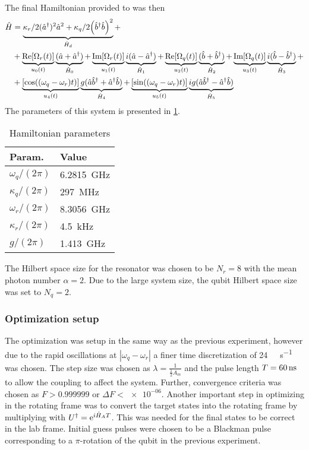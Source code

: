 \documentclass[main.tex]{subfiles}
\begin{document}
The final Hamiltonian provided to \krotov{} was then
\begin{equation}
    \begin{split}
        \hat{H} &= \underbrace{\kappa_r/2(\hat{a}^\dagger)^2\hat{a}^2 +\kappa_q/2\qty(\hat{b}^\dagger\hat{b})^2}_{\hat{H}_d} + \\
        &+\underbrace{\text{Re}\qty[\Omega_r(t)]}_{u_0(t)}\underbrace{(\hat{a} + \hat{a}^\dagger)}_{\hat{H}_0} + \underbrace{\text{Im}\qty[\Omega_r(t)]}_{u_1(t)}\underbrace{i(\hat{a} - \hat{a}^\dagger)}_{\hat{H}_1} + \underbrace{\text{Re}\qty[\Omega_q(t)]}_{u_2(t)}\underbrace{(\hat{b} + \hat{b}^\dagger)}_{\hat{H}_2} + \underbrace{\text{Im}\qty[\Omega_q(t)]}_{u_3(t)}\underbrace{i(\hat{b} - \hat{b}^\dagger)}_{\hat{H}_3} +\\
        &+\underbrace{\qty[\cos((\omega_q-\omega_r)t)]}_{u_4(t)}\underbrace{g(\hat{a}\hat{b}^\dagger + \hat{a}^\dagger\hat{b})}_{\hat{H}_4} + \underbrace{\qty[\sin((\omega_q-\omega_r)t)]}_{u_5(t)}\underbrace{ig(\hat{a}\hat{b}^\dagger - \hat{a}^\dagger\hat{b})}_{\hat{H}_5}
        \label{eq:cat-hamiltonian-rotating}
    \end{split}
\end{equation}
The parameters of this system is presented in \cref{tab:ham-params}.
\begin{table}[H]
    \caption{Hamiltonian parameters}%
    \label{tab:ham-params}
    \centering
    \begin{tabular}{@{}ll@{}}
    \toprule
    Param. & Value\\ \midrule
    \(\omega_q/(2\pi)\) & \SI{6.2815}{\giga\hertz} \\
    \(\kappa_q/(2\pi)\) & \SI{297}{\mega\hertz} \\
    \(\omega_r/(2\pi)\) & \SI{8.3056}{\giga\hertz} \\
    \(\kappa_r/(2\pi)\) & \SI{4.5}{\kilo\hertz} \\
    \(g/(2\pi)\) & \SI{1.413}{\giga\hertz} \\
    \bottomrule
    \end{tabular}
\end{table}
The Hilbert space size for the resonator was chosen to be \( N_r = 8 \) with the mean photon number \(\alpha = 2\).
Due to the large system size, the qubit Hilbert space size was set to \(N_q = 2\).

\subsubsection{Optimization setup}
The optimization was setup in the same way as the previous experiment, however due to the rapid oscillations at \(|\omega_q-\omega_r|\) a finer time discretization of \SI{24}{\giga\samples\per\second} was chosen.
The step size was chosen as \(\lambda = \frac{1}{\frac{1}{2}A_{m}}\) and the pulse length \(T = \SI{60}{\nano\second}\) to allow the coupling to affect the system.
Further, convergence criteria was chosen as \(F>0.999999\) or \(\Delta F < \num{e-06}\).
Another important step in optimizing in the rotating frame was to convert the target states into the rotating frame by multiplying with \(U^\dagger = \mathrm{e}^{i\hat{H}_A T}\).
This was needed for the final states to be correct in the lab frame.
Initial guess pulses were chosen to be a Blackman pulse corresponding to a \(\pi\)-rotation of the qubit in the previous experiment.
\end{document}
